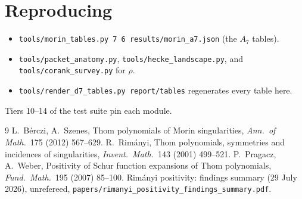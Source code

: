 \documentclass[11pt,a4paper]{article}
\theoremstyle{plain}
\theoremstyle{definition}
\theoremstyle{remark}
\begin{document}
\section*{Reproducing}
\begin{itemize}[nosep]
\item \texttt{tools/morin\_tables.py 7 6 results/morin\_a7.json} (the $A_7$ tables).
\item \texttt{tools/packet\_anatomy.py}, \texttt{tools/hecke\_landscape.py}, and
  \texttt{tools/corank\_survey.py} for $\rho$.
\item \texttt{tools/render\_d7\_tables.py report/tables} regenerates every table here.
\end{itemize}
Tiers 10--14 of the test suite pin each module.

\begin{thebibliography}{9}
 L.~B\'erczi, A.~Szenes, Thom polynomials of Morin singularities, \emph{Ann.\ of Math.}\ 175 (2012) 567--629.
 R.~Rim\'anyi, Thom polynomials, symmetries and incidences of singularities, \emph{Invent.\ Math.}\ 143 (2001) 499--521.
 P.~Pragacz, A.~Weber, Positivity of Schur function expansions of Thom polynomials, \emph{Fund.\ Math.}\ 195 (2007) 85--100.
 Rim\'anyi positivity: findings summary (29 July 2026), unrefereed, \texttt{papers/rimanyi\_positivity\_findings\_summary.pdf}.
\end{thebibliography}
\end{document}
